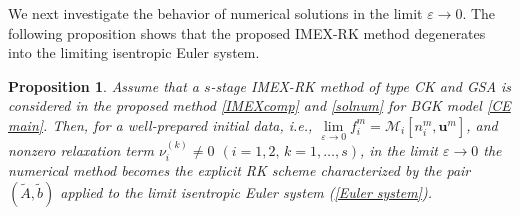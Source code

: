 \documentclass[10pt,reqno]{amsart}
\numberwithin{equation}{section}
\newtheorem{proposition}{Proposition}[section]
\begin{document}
We next investigate the behavior of numerical solutions in the limit $\varepsilon\to 0$. The following proposition shows that the proposed IMEX-RK method degenerates into the limiting isentropic Euler system.
\begin{proposition}\label{prop}
	Assume that a $s$-stage IMEX-RK method of type CK and GSA is considered in the proposed method \eqref{IMEXcomp} and \eqref{solnum} for BGK model \eqref{CE main}.
	Then, for a well-prepared initial
	data, i.e., $\lim\limits_{\varepsilon \to 0} f_i^m=\mathcal{M}_i[n_i^m,\mathbf{u}^m]$, and nonzero relaxation term $\nu_i^{(k)}\neq 0$ $(i=1,2,\, k=1,\dots,s)$, in the limit $\varepsilon \to 0$ the numerical method becomes the explicit RK scheme characterized by the pair $(\tilde{A},\tilde{b})$ applied to the limit isentropic Euler system (\ref{Euler system}). 
\end{proposition}
\end{document}
